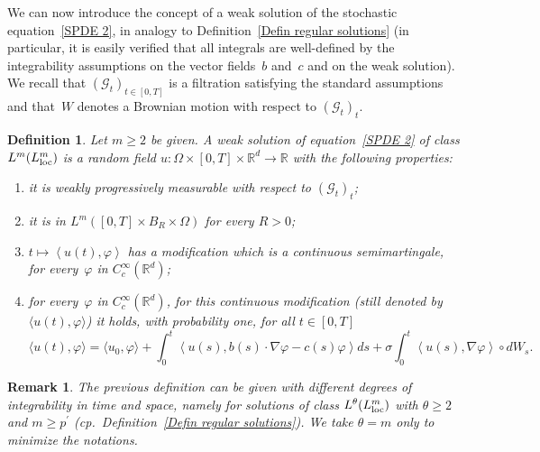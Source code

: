 \documentclass[a4paper,10pt]{article}
\newtheorem{definition}[theorem]{Definition}
\newtheorem{remark}[theorem]{Remark}
\newcommand\1{\mathbbm{1}}
\newcommand{\lan}{\langle}
\newcommand{\ran}{\rangle}
\newcommand\loc{{\rm loc}}
\numberwithin{equation}{section}
\begin{document}
We can now introduce the concept of a weak solution of the stochastic equation~\eqref{SPDE 2}, in analogy to Definition~\ref{Defin regular solutions} (in particular, it is easily verified that all integrals are well-defined by the integrability assumptions on the vector fields~$b$ and~$c$ and on the weak solution). We recall that $(\mathcal{G}_t)_{t\in[0,T]}$ is a filtration satisfying the standard assumptions and that~$W$ denotes a Brownian motion with respect to $(\mathcal{G}_t)_t$.

\begin{definition}
\label{Def weak sol SPDE}
Let $m\geq2$ be given. A \emph{weak solution of equation~\eqref{SPDE 2} of class $L^{m}(L^{m}_\loc)$} is a random field $u \colon \Omega\times [0,T]
\times\mathbb{R}^{d}\rightarrow\mathbb{R}$ with the following properties:\begin{enumerate}[font=\normalfont, label=(\roman{*}), ref=(\roman{*})]
  \item[(o)] it is weakly progressively measurable with respect to $(\mathcal{G}_{t})_t$;
  \item it is in $L^{m}([0,T] \times B_{R}\times \Omega)$ for every $R>0$;
  \item $t\mapsto\left\langle u(t)  ,\varphi\right\rangle $ has a modification which 
  is a continuous semimartingale, for every~$\varphi$ in $C_{c}^{\infty}(\mathbb{R}^{d})$;
  \item for every~$\varphi$ in $C_{c}^{\infty}(\mathbb{R}^{d})$, for this continuous modification \textup{(}still denoted by $\lan u(t),\varphi\ran$\textup{)} it holds, with probability one, for all $t \in [0,T]$
\[\label{formulation_SPDE2}
\langle u(t)  ,\varphi\rangle=\langle u_{0},\varphi\rangle 
+\int_{0}^{t}\left\langle u(s)  ,b(s)  \cdot
\nabla\varphi-c(s)  \varphi\right\rangle ds + \sigma \int_{0}^{t}\left\langle u(s)  ,\nabla\varphi\right\rangle \circ dW_{s} .
\]
\end{enumerate}
\end{definition}

\begin{remark}
The previous definition can be given with different degrees of integrability in time and space, namely for solutions of class $L^{\theta}(L_{\loc}^{m})$ with $\theta\geq2$ and $m\geq p^{\prime}$ \textup{(}cp.~Definition~\ref{Defin regular solutions}\textup{)}. We take $\theta=m$ only to minimize the notations.
\end{remark}
\end{document}
